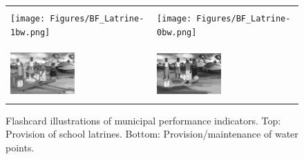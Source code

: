 \documentclass[11pt]{article}
\begin{document}
\begin{figure}
\begin{tabularx}{\textwidth}{|l l|}
\hline
&\\
\texttt{[image: Figures/BF\_Latrine-1bw.png]}
&\texttt{[image: Figures/BF\_Latrine-0bw.png]}\\
&\\
\hline
\multicolumn{2}{X}{ }\\
\hline
&\\
\includegraphics[width=0.47\textwidth]{Figures/BF_Water-1bw.png}
&\includegraphics[width=0.47\textwidth]{Figures/BF_Water-0bw.png}\\
&\\
\hline
\end{tabularx}
\caption{Flashcard illustrations of municipal performance indicators. Top: Provision of school latrines. Bottom: Provision/maintenance of water points. }
\label{FigFlashcards}
\end{figure}
\end{document}
